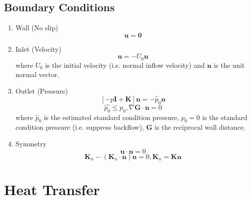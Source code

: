     \subsection{Boundary Conditions}
        \begin{enumerate}
            \item Wall (No slip)
                \begin{equation}
                    \mathbf{u} = \mathbf{0}
                \end{equation}
        
            \item Inlet (Velocity)
                \begin{equation}
                    \mathbf{u} = -U_{0} \mathbf{n}
                \end{equation}
                    where \(U_{0}\) is the initial velocity (i.e. normal inflow velocity) and \(\mathbf{n}\) is the unit normal vector. 
            
            \item Outlet (Pressure)
                \begin{equation}
                    \left[-p\textbf{I} + \textbf{K} \right]\mathbf{n} = - \hat{p}_{0} \mathbf{n} %
                \end{equation}
                \begin{equation}
                    \hat{p_{0}} \leq p_{0}, \nabla \mathbf{G} \cdot \mathbf{n} = 0
                \end{equation}
                    where \(\hat{p}_{0}\) is the estimated standard condition pressure, \(p_{0}=0\) is the standard condition pressure (i.e. suppress backflow), \(\mathbf{G}\) is the reciprocal wall distance. 
        
            \item Symmetry 
                \begin{equation}
                    \mathbf{u} \cdot \mathbf{n} = 0
                \end{equation}
                \begin{equation}
                    \mathbf{K}_{n} - (\mathbf{K}_{n} \cdot \mathbf{n})\mathbf{n} = 0, \mathbf{K}_{n} = \mathbf{Kn}
                \end{equation}
        \end{enumerate}
        
\section{Heat Transfer}

